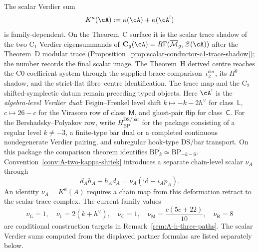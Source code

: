 The scalar Verdier sum
\[
K^\kappa(\cA):=\kappa(\cA)+\kappa(\cA^!)
\]
is family-dependent. On the Theorem~C surface it is the scalar trace
shadow of the two \(\mathrm{C}_1\) Verdier eigensummands of
$\mathbf C_g(\cA)=R\Gamma(\overline{\mathcal M}_g,\mathcal Z(\cA))$
after the Theorem~D modular trace
\textup{(}Proposition~\ref{prop:scalar-conductor-c1-trace-shadow}\textup{)};
the number records the final scalar image.  The Theorem~H derived
centre reaches the C0 coefficient system through the supplied brace
comparison~$\iota_Z^{\mathrm{der}}$, its $H^0$ shadow, and the strict-flat
fibre--centre identification.  The trace map and the \(\mathrm{C}_2\)
shifted-symplectic datum remain preceding typed objects. Here $\cA^!$ is the
\emph{algebra-level Verdier dual}: Feigin--Frenkel level shift
$k\mapsto -k-2h^\vee$ for
class~$\mathsf L$, $c\mapsto 26-c$ for the Virasoro row of
class~$\mathsf M$, and ghost-pair flip for class~$\mathsf C$.
For the Bershadsky--Polyakov row, write
$H_{\mathrm{BP}}^{\mathrm{DS/bar}}$ for the package consisting of a
regular level $k\ne-3$, a finite-type bar dual or a completed
continuous nondegenerate Verdier pairing, and subregular hook-type
DS/bar transport.  On this package the comparison theorem identifies
$\mathrm{BP}_k^!\simeq\mathrm{BP}_{-k-6}$.
Convention~\ref{conv:A-two-kappa-shriek} introduces a separate
chain-level scalar $\nu_A$ through
\[
 d_Ah_A+h_Ad_A
 =\nu_A(\mathrm{id}-\iota_Ap_A).
\]
An identity $\nu_A=K^\kappa(A)$ requires a chain map from this
deformation retract to the scalar trace complex.  The current family
values
\[
 \nu_{\mathsf G}=1,
 \quad
 \nu_{\mathsf L}=2(k+h^\vee),
 \quad
 \nu_{\mathsf C}=1,
 \quad
 \nu_{\mathsf M}=\frac{c(5c+22)}{10},
 \quad
 \nu_{\mathsf B}=8
\]
are conditional construction targets in
Remark~\ref{rem:A-h-three-paths}.  The scalar Verdier sums computed
from the displayed partner formulas are listed separately below.
